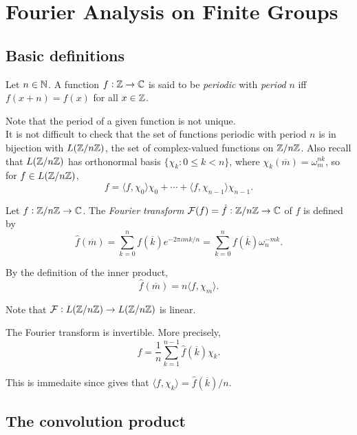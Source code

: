 \section{Fourier Analysis on Finite Groups}

	\subsection{Basic definitions}

		\begin{definition}
			Let $n \in \mathbb{N}$. A function $f : \mathbb{Z} \to \mathbb{C}$ is said to be \emph{periodic} with \emph{period} $n$ iff $f(x+n) = f(x)$ for all $x \in \mathbb{Z}$.
		\end{definition}

		Note that the period of a given function is not unique.\\
		It is not difficult to check that the set of functions periodic with period $n$ is in bijection with $L(\mathbb{Z}/n\mathbb{Z})$, the set of complex-valued functions on $\mathbb{Z}/n\mathbb{Z}$. Also recall that $L(\mathbb{Z}/n\mathbb{Z})$ has orthonormal basis $\{\chi_k : 0 \le k < n\}$, where $\chi_k(\overline{m}) = \omega_m^{nk}$, so for $f \in L(\mathbb{Z}/n\mathbb{Z})$,
		\[ f = \langle f,\chi_0\rangle \chi_0 + \cdots + \langle f,\chi_{n-1}\rangle \chi_{n-1}. \]

		\begin{fdef}
			Let $f : \mathbb{Z}/n\mathbb{Z} \to \mathbb{C}$. The \emph{Fourier transform} $\mathcal{F}(f) = \hat{f} : \mathbb{Z}/n\mathbb{Z} \to \mathbb{C}$ of $f$ is defined by
			\[ \hat{f}(\overline{m}) = \sum_{k=0}^n f(\overline{k}) e^{-2\pi\iota mk/n} = \sum_{k=0}^n f(\overline{k}) \omega_n^{-mk}. \]
		\end{fdef}

		By the definition of the inner product,
		\begin{equation}
			\label{eqn: fourier character innprod relation}
			\hat{f}(\overline{m}) = n \langle f,\chi_m\rangle.
		\end{equation}

		Note that $\mathcal{F} : L(\mathbb{Z}/n\mathbb{Z}) \to L(\mathbb{Z}/n\mathbb{Z})$ is linear.

		\begin{fprop}
			The Fourier transform is invertible. More precisely,
			\[ f = \frac{1}{n} \sum_{k=1}^{n-1} \hat{f}(\overline{k}) \chi_k. \]
		\end{fprop}
		This is immedaite since  gives that $\langle f,\chi_k\rangle = \hat{f}(\overline{k})/n$.

	\subsection{The convolution product}


